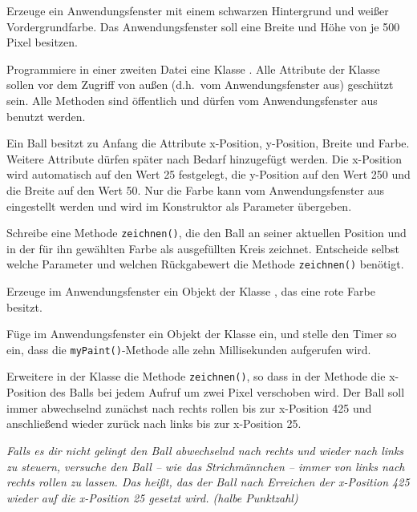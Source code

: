 \begin{compactenum}[a)]
\item Erzeuge ein Anwendungsfenster mit einem schwarzen Hintergrund und weißer
Vordergrundfarbe. Das Anwendungsfenster soll eine Breite und Höhe von je 500
Pixel besitzen.

\item Programmiere in einer zweiten Datei eine Klasse . Alle
Attribute der Klasse  sollen vor dem Zugriff von außen (d.h.\ vom
Anwendungsfenster aus) geschützt sein. Alle Methoden sind öffentlich und dürfen
vom Anwendungsfenster aus benutzt werden.

Ein Ball besitzt zu Anfang die Attribute x-Position, y-Position, Breite und
Farbe. Weitere Attribute dürfen später nach Bedarf hinzugefügt werden. Die
x-Position wird automatisch auf den Wert 25 festgelegt, die y-Position auf den
Wert 250 und die Breite auf den Wert 50. Nur die Farbe kann vom
Anwendungsfenster aus eingestellt werden und wird im Konstruktor als Parameter
übergeben.

Schreibe eine Methode \lstinline|zeichnen()|, die den Ball an seiner aktuellen
Position und in der für ihn gewählten Farbe als ausgefüllten Kreis zeichnet.
Entscheide selbst welche Parameter und welchen Rückgabewert die Methode
\lstinline|zeichnen()| benötigt.

\item Erzeuge im Anwendungsfenster ein Objekt der Klasse , das
eine rote Farbe besitzt.

\item Füge im Anwendungsfenster ein Objekt der Klasse  ein, und
stelle den Timer so ein, dass die \lstinline|myPaint()|-Methode alle zehn
Millisekunden aufgerufen wird.

\item Erweitere in der Klasse  die Methode \lstinline|zeichnen()|,
so dass in der Methode die x-Position des Balls bei jedem Aufruf um zwei Pixel
verschoben wird. Der Ball soll immer abwechselnd zunächst nach rechts rollen
bis zur x-Position 425 und anschließend wieder zurück nach links bis zur
x-Position 25.

\emph{Falls es dir nicht gelingt den Ball abwechselnd nach rechts und wieder
nach links zu steuern, versuche den Ball -- wie das Strichmännchen -- immer von
links nach rechts rollen zu lassen. Das heißt, das der Ball nach Erreichen der
x-Position 425 wieder auf die x-Position 25 gesetzt wird. (halbe Punktzahl)} 


\end{compactenum}
